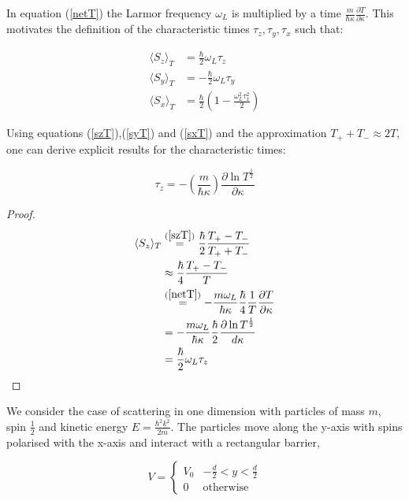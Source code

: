 \documentclass{article}
\begin{document}
\noindent In equation (\ref{netT}) the Larmor frequency $\omega_L$ is multiplied by a time $\frac{m}{\hbar\kappa}\frac{\partial T}{\partial \kappa}$. This motivates the definition of the characteristic times $\tau_z, \tau_y, \tau_x$ such that:

\begin{align}
	\langle S_z \rangle_T &= \frac{\hbar}{2}\omega_L\tau_z \\
	\langle S_y \rangle_T &= -\frac{\hbar}{2}\omega_L\tau_y \\
	\langle S_x \rangle_T &= \frac{\hbar}{2}\left(1-\frac{\omega_L^2\tau_x^2}{2}\right)
\end{align}

\noindent Using equations (\ref{szT}),(\ref{syT}) and (\ref{sxT}) and the approximation $T_++T_- \approx 2T$, one can derive explicit results for the characteristic times:

\begin{equation}
	\tau_z = -\left(\frac{m}{\hbar\kappa}\right)\frac{\partial \ln{T^{\frac{1}{2}}}}{\partial\kappa}
\end{equation}

\begin{proof}
\begin{align}
	\langle S_z \rangle_T &\stackrel{(\ref{szT})}{=}\frac{\hbar}{2}\frac{T_+-T_-}{T_++T_-}\\
	&\approx \frac{\hbar}{4}\frac{T_+-T_-}{T}\\
	&\stackrel{(\ref{netT})}{=}-\frac{m\omega_L}{\hbar\kappa}\frac{\hbar}{4}\frac{1}{T}\frac{\partial T}{\partial \kappa} \\
	&=-\frac{m\omega_L}{\hbar\kappa}\frac{\hbar}{2}\frac{\partial\ln{T^{\frac{1}{2}}}}{d\kappa} \\
	&=\frac{\hbar}{2}\omega_L\tau_z
\end{align}
\end{proof}




We consider the case of scattering in one dimension with particles of mass $m$, spin $\frac{1}{2}$ and kinetic energy $
E = \frac{\hbar^2k^2}{2m}$. The particles move along the y-axis with spins polarised with the x-axis and interact with a rectangular barrier,

\begin{equation}
	V = 
	\begin{cases}
	V_0 & -\frac{d}{2}<y<\frac{d}{2}\\
		0 & \text{otherwise}
	\end{cases}
\end{equation}
\end{document}

